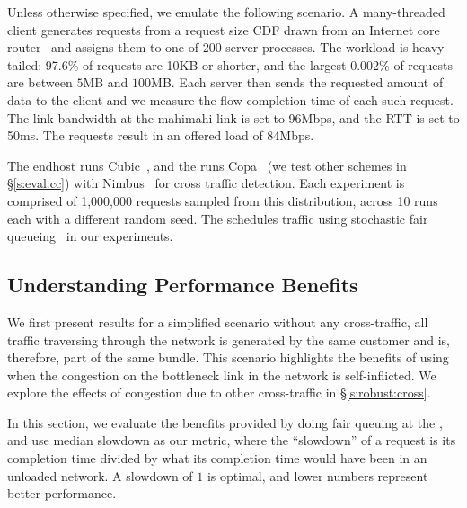 Unless otherwise specified, we emulate the following scenario.
A many-threaded client generates requests from a request size CDF drawn from an Internet core router~\cite{caida-dataset} and assigns them to one of $200$ server processes.
The workload is heavy-tailed: 97.6\% of requests are 10KB or shorter, and the largest 0.002\% of requests are between $5$MB and $100$MB.
Each server then sends the requested amount of data to the client and we measure the flow completion time of each such request. 
The link bandwidth at the mahimahi link is set to 96Mbps, and the RTT is set to 50ms. The requests result in an offered load of 84Mbps. 

The endhost runs Cubic~\cite{cubic}, and the \inbox runs Copa~\cite{copa} (we test other schemes in \S\ref{s:eval:cc}) with Nimbus~\cite{nimbus-arxiv} for cross traffic detection. 
Each experiment is comprised of 1,000,000 requests sampled from this distribution, across 10 runs each with a different random seed.
The \inbox schedules traffic using stochastic fair queueing~\cite{sfq} in our experiments. 


\subsection{Understanding Performance Benefits}\label{s:eval:fct}

We first present results for a simplified scenario without any cross-traffic, \ie all traffic traversing through the network is generated by the same customer and is, therefore, part of the same bundle. 
This scenario highlights the benefits of using \name when the congestion on the bottleneck link in the network is self-inflicted. We explore the effects of congestion due to other cross-traffic in \S\ref{s:robust:cross}.


\newcommand{\baseline}{Status Quo\xspace}
\newcommand{\optimal}{In-Network\xspace}

In this section, we evaluate the benefits provided by doing fair queuing at the \name, and use median slowdown as our metric, where the ``slowdown'' of a request is its completion time divided by what its completion time would have been in an unloaded network. A slowdown of $1$ is optimal, and lower numbers represent better performance.

